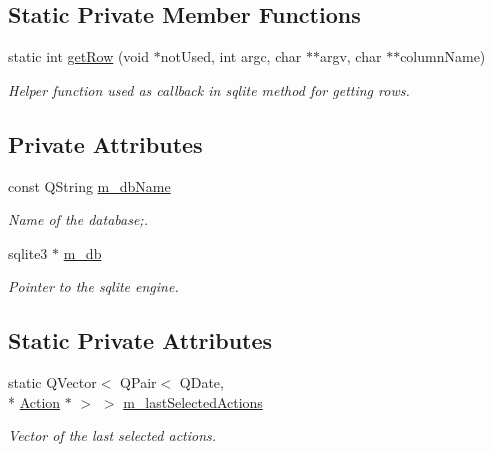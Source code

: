 \subsection*{Static Private Member Functions}
\begin{DoxyCompactItemize}
\item 
static int \hyperlink{class_database_ae6ab1b4da47468a98e480b195d56c17a}{get\-Row} (void $\ast$not\-Used, int argc, char $\ast$$\ast$argv, char $\ast$$\ast$column\-Name)
\begin{DoxyCompactList}\small\item\em Helper function used as callback in sqlite method for getting rows. \end{DoxyCompactList}\end{DoxyCompactItemize}
\subsection*{Private Attributes}
\begin{DoxyCompactItemize}
\item 
const Q\-String \hyperlink{class_database_ae86350d76c5160ec0bcd2b352e82248a}{m\-\_\-db\-Name}
\begin{DoxyCompactList}\small\item\em Name of the database;. \end{DoxyCompactList}\item 
sqlite3 $\ast$ \hyperlink{class_database_ac64f96c196a98d531cbe18a9fadc3b4b}{m\-\_\-db}
\begin{DoxyCompactList}\small\item\em Pointer to the sqlite engine. \end{DoxyCompactList}\end{DoxyCompactItemize}
\subsection*{Static Private Attributes}
\begin{DoxyCompactItemize}
\item 
static Q\-Vector$<$ Q\-Pair$<$ Q\-Date, \\*
\hyperlink{class_action}{Action} $\ast$ $>$ $>$ \hyperlink{class_database_a235387dc22dc1a6057af86c330440dca}{m\-\_\-last\-Selected\-Actions}
\begin{DoxyCompactList}\small\item\em Vector of the last selected actions. \end{DoxyCompactList}\end{DoxyCompactItemize}


